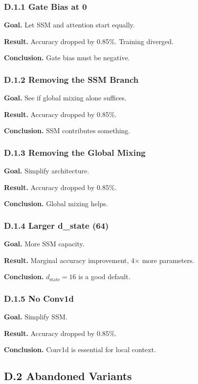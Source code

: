\subsubsection{D.1.1 Gate Bias at 0}

\textbf{Goal.} Let SSM and attention start equally.

\textbf{Result.} Accuracy dropped by 0.85\%. Training diverged.

\textbf{Conclusion.} Gate bias must be negative.

\subsubsection{D.1.2 Removing the SSM Branch}

\textbf{Goal.} See if global mixing alone suffices.

\textbf{Result.} Accuracy dropped by 0.85\%.

\textbf{Conclusion.} SSM contributes something.

\subsubsection{D.1.3 Removing the Global Mixing}

\textbf{Goal.} Simplify architecture.

\textbf{Result.} Accuracy dropped by 0.85\%.

\textbf{Conclusion.} Global mixing helps.

\subsubsection{D.1.4 Larger d\_state (64)}

\textbf{Goal.} More SSM capacity.

\textbf{Result.} Marginal accuracy improvement, 4$\times$ more parameters.

\textbf{Conclusion.} $d_\text{state} = 16$ is a good default.

\subsubsection{D.1.5 No Conv1d}

\textbf{Goal.} Simplify SSM.

\textbf{Result.} Accuracy dropped by 0.85\%.

\textbf{Conclusion.} Conv1d is essential for local context.

\subsection{D.2 Abandoned Variants}


